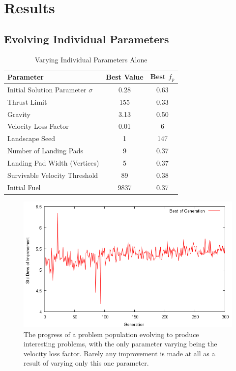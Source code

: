 \documentclass[conference]{IEEEtran}
\begin{document}
\section{Results}

\subsection{Evolving Individual Parameters}

\begin{table}[ht]
\caption{Varying Individual Parameters Alone}
\label{tab:single}
\begin{tabular}{l | c | c}
\hline
Parameter & Best Value & Best $f_{p}$ \\
\hline
Initial Solution Parameter $\sigma$	& 0.28 & 0.63 \\
Thrust Limit & 155 & 0.33 \\
Gravity	 & 3.13 & 0.50 \\
Velocity Loss Factor & 0.01 & 6 \\
Landscape Seed & 1 & 147 \\
Number of Landing Pads	& 9 & 0.37 \\
Landing Pad Width (Vertices)	& 5 & 0.37	 \\
Survivable Velocity Threshold	& 89 & 0.38  \\
Initial Fuel	& 9837 & 0.37 \\
\hline	
\end{tabular}	
\end{table}

\begin{figure}[hbtp]
\centering
\includegraphics[scale=0.4]{img/graph_varyingvelloss}
\caption{The progress of a problem population evolving to produce interesting problems, with the only parameter varying being the velocity loss factor. Barely any improvement is made at all as a result of varying only this one parameter.}
\label{fig:graph_varyingvelloss}
\end{figure}
\end{document}
